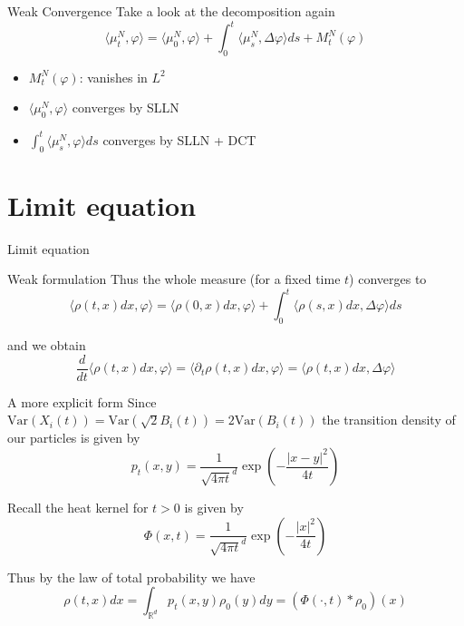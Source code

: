 \documentclass{beamer}
\newcommand{\sectionstart}[1]{
    \section{#1}
    \begin{frame}
        \centering
        \huge{#1}
    \end{frame}
}
\newcommand{\R}{\mathbb{R}}
\begin{document}
    \begin{frame}{Weak Convergence}
        Take a look at the decomposition again
        \begin{equation*}
            \langle\mu_t^N, \varphi\rangle = \langle\mu_0^N, \varphi\rangle
            +\int_0^t\langle\mu_s^N,\Delta\varphi\rangle ds + M_t^N(\varphi)
        \end{equation*}

        \pause
        \begin{itemize}
            \item $M_t^N(\varphi)$: vanishes in $L^2$
            \pause
            \item $\langle\mu_0^N,\varphi\rangle$ converges by SLLN
            \pause
            \item $\int_0^t\langle\mu_s^N,\varphi\rangle ds$ converges by SLLN + DCT
        \end{itemize}
    \end{frame}

    \sectionstart{Limit equation}

    \begin{frame}{Weak formulation}
        Thus the whole measure (for a fixed time $t$) converges to
        \begin{equation*}
            \langle\rho(t,x)dx,\varphi\rangle = \langle\rho(0,x)dx,\varphi\rangle
            + \int_0^t\langle\rho(s,x)dx,\Delta\varphi\rangle ds
        \end{equation*}

        \pause
        
        and we obtain
        \begin{equation*}
            \frac{d}{dt}\langle\rho(t,x)dx,\varphi\rangle
            = \langle\partial_t\rho(t,x)dx,\varphi\rangle
            = \langle\rho(t,x)dx,\Delta\varphi\rangle
        \end{equation*}
    \end{frame}

    \begin{frame}{A more explicit form}
        Since $\text{Var}(X_i(t)) = \text{Var}(\sqrt 2B_i(t)) = 2\text{Var}(B_i(t))$
        the transition density of our particles is given by
        \begin{equation*}
            p_t(x,y) = \frac{1}{\sqrt{4\pi t}^d}\exp\left(-\frac{\vert x-y\vert^2}{4t}\right)
        \end{equation*}

        \pause

        Recall the heat kernel for $t > 0$ is given by
        \begin{equation*}
            \Phi(x,t) =\frac{1}{\sqrt{4\pi t}^d}\exp\left(-\frac{\vert x\vert^2}{4t}\right)
        \end{equation*}

        \pause

        Thus by the law of total probability we have
        \begin{equation*}
            \rho(t,x)dx = \int_{\R^d}p_t(x,y)\rho_0(y)dy = (\Phi(\cdot,t)\ast\rho_0)(x)
        \end{equation*}
    \end{frame}
\end{document}
